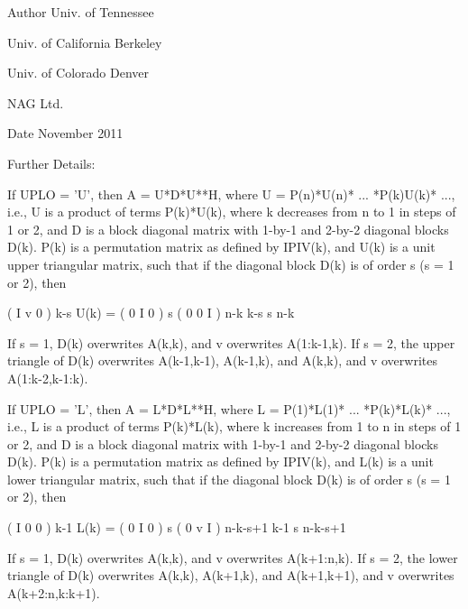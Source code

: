 \begin{DoxyAuthor}{Author}
Univ. of Tennessee 

Univ. of California Berkeley 

Univ. of Colorado Denver 

N\+A\+G Ltd. 
\end{DoxyAuthor}
\begin{DoxyDate}{Date}
November 2011 
\end{DoxyDate}
\begin{DoxyParagraph}{Further Details\+: }
\begin{DoxyVerb}  If UPLO = 'U', then A = U*D*U**H, where
     U = P(n)*U(n)* ... *P(k)U(k)* ...,
  i.e., U is a product of terms P(k)*U(k), where k decreases from n to
  1 in steps of 1 or 2, and D is a block diagonal matrix with 1-by-1
  and 2-by-2 diagonal blocks D(k).  P(k) is a permutation matrix as
  defined by IPIV(k), and U(k) is a unit upper triangular matrix, such
  that if the diagonal block D(k) is of order s (s = 1 or 2), then

             (   I    v    0   )   k-s
     U(k) =  (   0    I    0   )   s
             (   0    0    I   )   n-k
                k-s   s   n-k

  If s = 1, D(k) overwrites A(k,k), and v overwrites A(1:k-1,k).
  If s = 2, the upper triangle of D(k) overwrites A(k-1,k-1), A(k-1,k),
  and A(k,k), and v overwrites A(1:k-2,k-1:k).

  If UPLO = 'L', then A = L*D*L**H, where
     L = P(1)*L(1)* ... *P(k)*L(k)* ...,
  i.e., L is a product of terms P(k)*L(k), where k increases from 1 to
  n in steps of 1 or 2, and D is a block diagonal matrix with 1-by-1
  and 2-by-2 diagonal blocks D(k).  P(k) is a permutation matrix as
  defined by IPIV(k), and L(k) is a unit lower triangular matrix, such
  that if the diagonal block D(k) is of order s (s = 1 or 2), then

             (   I    0     0   )  k-1
     L(k) =  (   0    I     0   )  s
             (   0    v     I   )  n-k-s+1
                k-1   s  n-k-s+1

  If s = 1, D(k) overwrites A(k,k), and v overwrites A(k+1:n,k).
  If s = 2, the lower triangle of D(k) overwrites A(k,k), A(k+1,k),
  and A(k+1,k+1), and v overwrites A(k+2:n,k:k+1).\end{DoxyVerb}
 
\end{DoxyParagraph}
